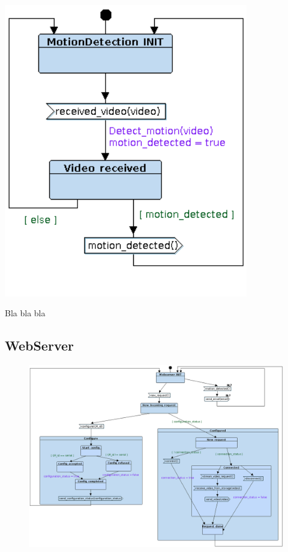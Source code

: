 \documentclass{article}
\begin{document}
\begin{minipage}{\linewidth}
  \centering
  \begin{minipage}{0.6\linewidth}
    \centering
    \includegraphics[width = 0.8\textwidth]{Foscam10.png}
  \end{minipage}
  \begin{minipage}{0.35\linewidth}
    Bla bla bla 
  \end{minipage}
\end{minipage}

\newpage
\subsection{WebServer}
\label{sec:WebServer}

\begin{figure}[h!]
  \centering
  \includegraphics[width = \textwidth]{Foscam09.png}
\end{figure}
\end{document}
